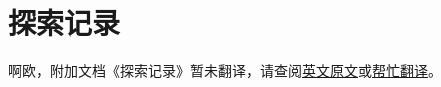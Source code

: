 \renewcommand{\DOCNAME}{探索记录}
\renewcommand{\DOCSLUG}{026-exploration-logs}

\chapter{
    \DOCNAME
}

\label{chap:DOC-\DOCSLUG}

啊欧，附加文档《\DOCNAME 》暂未翻译，请查阅\href{http://scp-wiki.wikidot.com/\DOCSLUG}{英文原文}或\href{http://scp-wiki-cn.wikidot.com/\DOCSLUG}{帮忙翻译}。
